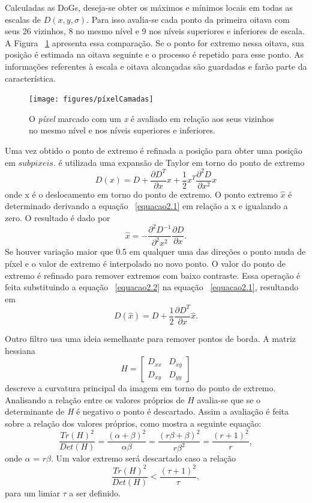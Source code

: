 Calculadas as DoGs, deseja-se obter os máximos e mínimos locais em todas as escalas de $\textit{D}(x,y,\sigma)$. Para isso avalia-se cada ponto da primeira oitava com seus 26 vizinhos, 8 no mesmo nível e 9 nos níveis superiores e inferiores de escala. A Figura ~\ref{fig:píxelcamadas} apresenta essa comparação. Se o ponto for extremo nessa oitava, sua posição é estimada na oitava seguinte e o processo é repetido para esse ponto. As informações referentes à escala e oitava alcançadas são guardadas e farão parte da característica. 


\begin{figure}[h!]
	\centering
	\texttt{[image: figures/píxelCamadas]}
	\caption{O \textit{píxel} marcado com um \textit{x} é avaliado em relação aos seus vizinhos no mesmo nível e nos níveis superiores e inferiores. \cite{VisualOdometryRodasVehicles}}
	\label{fig:píxelcamadas}
\end{figure}

Uma vez obtido o ponto de extremo é refinada a posição para obter uma posição em $\textit{subpixeis}$. é utilizada uma expansão de Taylor em torno do ponto de extremo \begin{equation}\label{equacao2.1}
D(x) = D + \frac{\partial D^T}{\partial x}x + \frac{1}{2}x^T\frac{\partial^2D}{\partial x^2}x
\end{equation} onde x é o deslocamento em torno do ponto de extremo. O ponto extremo $\hat{x}$ é determinado derivando a equação ~\ref{equacao2.1} em relação a x e igualando a zero. O resultado é dado por \begin{equation}\label{equacao2.2}
\hat{x} = -\frac{\partial^2D^{-1}}{\partial^2x^2}\frac{\partial D}{\partial x}. 
\end{equation} 
Se houver variação maior que 0.5 em qualquer uma das direções o ponto muda de píxel e o valor de extremo é interpolado no novo ponto. O valor do ponto de extremo é refinado para remover extremos com baixo contraste. Essa operação é feita substituindo a equação ~\ref{equacao2.2} na equação ~\ref{equacao2.1}, resultando em \[ D( \hat{x} ) = D + \frac{1}{2}\frac{\partial D^T}{\partial x} \hat{x} . \]

Outro filtro usa uma ideia semelhante para remover pontos de borda. A matriz hessiana \[ \textit{H} = \left[ \begin{array}{cc}
D_{xx} & D_{xy} \\ 
D_{xy} & D_{yy}
\end{array} \right]  \] descreve a curvatura principal da imagem em torno do ponto de extremo. Analisando a relação entre os valores próprios de $\textit{H}$ avalia-se que se o determinante de \textit{H} é negativo o ponto é descartado. Assim a avaliação é feita sobre a relação dos valores próprios, como mostra a seguinte equação: \begin{equation}\label{equacaoseg}
\frac{\textit{Tr}(H)^2}{\textit{Det}(H)} = \frac{(\alpha + \beta)^2}{\alpha\beta} = \frac{(r\beta + \beta)^2}{r\beta^2} = \frac{(r + 1)^2}{r}, 
\end{equation} 
onde $\alpha$ = $r\beta$. Um valor extremo será descartado caso a relação \[ \frac{\textit{Tr}(H)^2}{\textit{Det}(H)} < \frac{(\tau + 1)^2}{\tau}, \] para um limiar $\tau$ a ser definido.  

